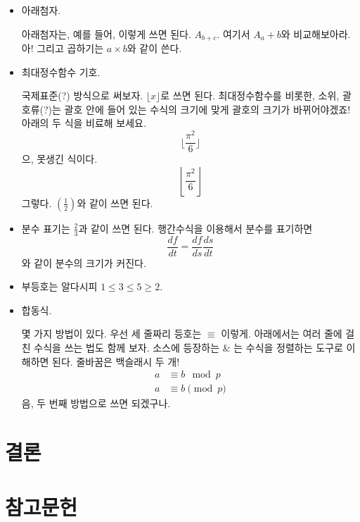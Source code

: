 \documentclass[10pt]{oblivoir}
\def\mykeywords{keyword1, keyword2, keyword3} %
\theoremstyle{definition}
\theoremstyle{remark}
\numberwithin{equation}{section}
\begin{document}
\begin{itemize}
    \item 아래첨자.

아래첨자는, 예를 들어, 이렇게 쓰면 된다. $A_{b+c}$. 여기서 $A_a+b$와 비교해보아라. 아! 그리고 곱하기는 $a\times b$와 같이 쓴다.
\item 최대정수함수 기호. 

국제표준(?) 방식으로 써보자. $\lfloor x\rfloor$로 쓰면 된다. 최대정수함수를 비롯한, 소위, 괄호류(?)는 괄호 안에 들어 있는 수식의 크기에 맞게 괄호의 크기가 바뀌어야겠죠! 아래의 두 식을 비료해 보세요.
\[ \lfloor \frac{\pi^2}{6}\rfloor \]
으, 못생긴 식이다.
\[ \left\lfloor \frac{\pi^2}{6}\right\rfloor \]
그렇다. $\left( \frac{1}{2} \right)$와 같이 쓰면 된다.

\item 분수 표기는 $\frac{2}{3}$과 같이 쓰면 된다. 행간수식을 이용해서 분수를 표기하면 
\[ \frac{df}{dt}=\frac{df}{ds}\frac{ds}{dt} \]
와 같이 분수의 크기가 커진다.


\item 부등호는 알다시피 $1\leq 3\leq 5 \geq 2$.

\item 합동식.

몇 가지 방법이 있다. 우선 세 줄짜리 등호는 $\equiv$ 이렇게. 아래에서는 여러 줄에 걸친 수식을 쓰는 법도 함께 보자. 소스에 등장하는 \& 는 수식을 정렬하는 도구로 이해하면 된다. 줄바꿈은 백슬래시 두 개!
\begin{align*}
a & \equiv b \mod{p} \\
a & \equiv b \pmod{p}
\end{align*}
음, 두 번째 방법으로 쓰면 되겠구나.
\end{itemize}



\section{결론} 
\jiwon[4] %











\section{참고문헌}
\printbibliography[heading=none]



%  

\end{document}
